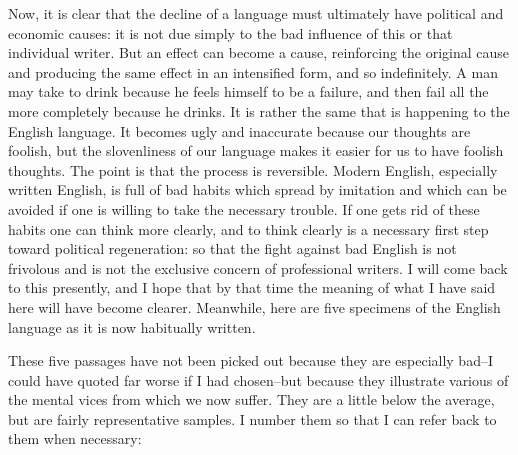 \documentclass[a4paper]{article}
\begin{document}
Now, it is clear that the decline of a language must ultimately have political and economic causes: it is not due simply to the bad influence of this or that individual writer. But an effect can become a cause, reinforcing the original cause and producing the same effect in an intensified form, and so indefinitely. A man may take to drink because he feels himself to be a failure, and then fail all the more completely because he drinks. It is rather the same that is happening to the English language. It becomes ugly and inaccurate because our thoughts are foolish, but the slovenliness of our language makes it easier for us to have foolish thoughts. The point is that the process is reversible. Modern English, especially written English, is full of bad habits which spread by imitation and which can be avoided if one is willing to take the necessary trouble. If one gets rid of these habits one can think more clearly, and to think clearly is a necessary first step toward political regeneration: so that the fight against bad English is not frivolous and is not the exclusive concern of professional writers. I will come back to this presently, and I hope that by that time the meaning of what I have said here will have become clearer. Meanwhile, here are five specimens of the English language as it is now habitually written. 

These five passages have not been picked out because they are especially bad--I could have quoted far worse if I had chosen--but because they illustrate various of the mental vices from which we now suffer. They are a little below the average, but are fairly representative samples. I number them so that I can refer back to them when necessary: 
\end{document}
